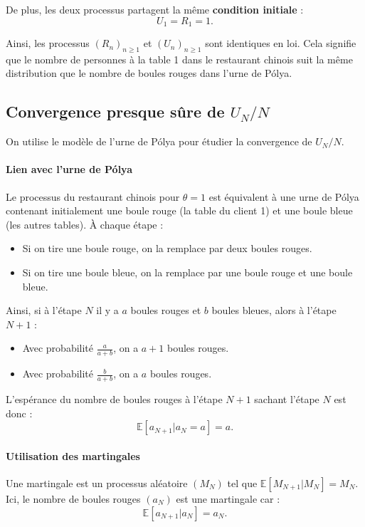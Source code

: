 \documentclass[12pt, a4paper]{article}
\theoremstyle{definition}
\theoremstyle{plain}
\begin{document}
De plus, les deux processus partagent la même \textbf{condition initiale} :
\[
U_1 = R_1 = 1.
\]

Ainsi, les processus $(R_n)_{n \geq 1}$ et $(U_n)_{n \geq 1}$ sont identiques en loi. Cela signifie que le nombre de personnes à la table 1 dans le restaurant chinois suit la même distribution que le nombre de boules rouges dans l'urne de Pólya.

\subsection{Convergence presque sûre de \( U_N / N \)}

On utilise le modèle de l'urne de Pólya pour étudier la convergence de \( U_N / N \).

\paragraph{Lien avec l'urne de Pólya}
Le processus du restaurant chinois pour \(\theta = 1\) est équivalent à une urne de Pólya contenant initialement une boule rouge (la table du client 1) et une boule bleue (les autres tables). À chaque étape :
\begin{itemize}
    \item Si on tire une boule rouge, on la remplace par deux boules rouges.
    \item Si on tire une boule bleue, on la remplace par une boule rouge et une boule bleue.
\end{itemize}
Ainsi, si à l'étape \(N\) il y a \(a\) boules rouges et \(b\) boules bleues, alors à l'étape \(N+1\) :
\begin{itemize}
    \item Avec probabilité \(\frac{a}{a+b}\), on a \(a+1\) boules rouges.
    \item Avec probabilité \(\frac{b}{a+b}\), on a \(a\) boules rouges.
\end{itemize}
L'espérance du nombre de boules rouges à l'étape \(N+1\) sachant l'étape \(N\) est donc :
\[
\mathbb{E}[a_{N+1} | a_N = a] = a.
\]

\paragraph{Utilisation des martingales}
Une martingale est un processus aléatoire \((M_N)\) tel que \(\mathbb{E}[M_{N+1} | M_N] = M_N\). Ici, le nombre de boules rouges \((a_N)\) est une martingale car :
\[
\mathbb{E}[a_{N+1} | a_N] = a_N.
\]
\end{document}
